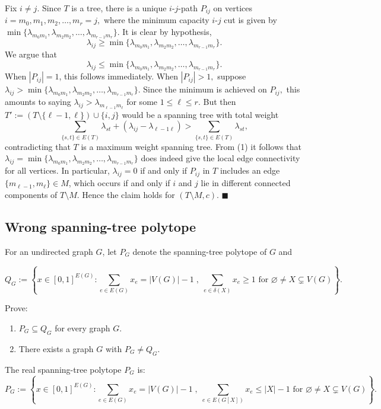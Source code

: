 \documentclass{article}
\let\emptyset\varnothing
\begin{document}
  Fix $i\neq j.$ Since $T$ is a tree, there is a unique $i$-$j$-path $P_{ij}$ on vertices $i=m_0, m_1,m_2,\dots,m_r=j,$ where the minimum capacity $i$-$j$ cut is given by $\min\{\lambda_{m_0m_1},\lambda_{m_2m_2},\dots,\lambda_{m_{r-1}m_r}\}.$ It is clear by hypothesis, $$\lambda_{ij} \geq \min\{\lambda_{m_0m_1},\lambda_{m_2m_2},\dots,\lambda_{m_{r-1}m_r}\}.$$ We argue that \begin{equation}\lambda_{ij} \leq \min\{\lambda_{m_0m_1},\lambda_{m_2m_2},\dots,\lambda_{m_{r-1}m_r}\}.\end{equation}
  When $|P_{ij}|=1$, this follows immediately. When $|P_{ij}|>1,$ suppose $\lambda_{ij} > \min\{\lambda_{m_0m_1},\lambda_{m_2m_2},\dots,\lambda_{m_{r-1}m_r}\}$. Since the minimum is achieved on $P_{ij},$ this amounts to saying $\lambda_{ij}>\lambda_{m_{\ell-1}m_{\ell}}$ for some $1\leq \ell\leq r.$ But then $T':=(T\setminus \{\ell-1,\ell\})\cup \{i,j\}$ would be a spanning tree with total weight $$\sum_{\{s,t\}\in E(T)}\lambda_{st}+(\lambda_{ij}-\lambda_{\ell-1\ell})>\sum_{\{s,t\}\in E(T)}\lambda_{st},$$contradicting that $T$ is a maximum weight spanning tree.
  From (1) it follows that $\lambda_{ij} = \min\{\lambda_{m_0m_1},\lambda_{m_2m_2},\dots,\lambda_{m_{r-1}m_r}\}$ does indeed give the local edge connectivity for all vertices. In particular, $\lambda_{ij}=0$ if and only if $P_{ij}$ in $T$ includes an edge $\{m_{\ell-1},m_{\ell}\}\in M$, which occurs if and only if $i$ and $j$ lie in different connected components of $T\setminus M.$ Hence the claim holds for $(T\setminus M,c).$ $\blacksquare$

  \subsection{Wrong spanning-tree polytope}
  \begin{centerframebox}
    For an undirected graph $G$, let $P_G$ denote the spanning-tree polytope of $G$ and

    \[ Q_{G} := \left\{
      x\in[0,1]^{E(G)}:
      \sum_{e\in E(G)} x_{e} = |V(G)|-1 \;,\;
      \sum_{e\in\delta(X)}x_{e} \geq 1
      \textrm{ for } \emptyset \neq X \subsetneq V(G) \right\}. \]

    Prove:
    \begin{enumerate}[label=(\roman*)]
      \item $P_G \subseteq Q_G$ for every graph $G$.
      \item There exists a graph $G$ with $P_G \neq Q_G$.
    \end{enumerate}

    The real spanning-tree polytope $P_G$ is:
    \[ P_{G} := \left\{
      x\in[0,1]^{E(G)}:
      \sum_{e\in E(G)} x_{e} = |V(G)|-1 \;,\;
      \sum_{e\in E(G[X])} x_{e} \leq |X|-1
      \textrm{ for } \emptyset \neq X \subsetneq V(G) \right\}. \]
  \end{centerframebox}
\end{document}

